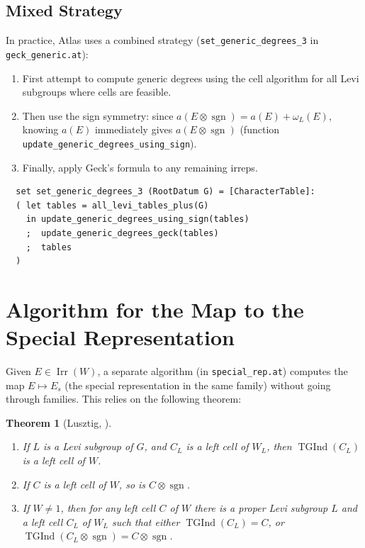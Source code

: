 \documentclass[12pt]{amsart}
\newtheorem{theorem}{Theorem}[section]
\newcommand{\sgn}{\operatorname{sgn}}
\newcommand{\Irr}{\operatorname{Irr}}
\newcommand{\TInd}{\operatorname{TGInd}}
\begin{document}
\subsection{Mixed Strategy}

In practice, Atlas uses a combined strategy (\texttt{set\_generic\_degrees\_3}
in \texttt{geck\_generic.at}):
\begin{enumerate}
  \item First attempt to compute generic degrees using the cell algorithm for
        all Levi subgroups where cells are feasible.
  \item Then use the sign symmetry: since $a(E \otimes \sgn) = a(E) +
        \omega_L(E)$, knowing $a(E)$ immediately gives $a(E \otimes \sgn)$
        (function \texttt{update\_generic\_degrees\_using\_sign}).
  \item Finally, apply Geck's formula to any remaining irreps.
\end{enumerate}
\begin{verbatim}
  set set_generic_degrees_3 (RootDatum G) = [CharacterTable]:
  ( let tables = all_levi_tables_plus(G)
    in update_generic_degrees_using_sign(tables)
    ;  update_generic_degrees_geck(tables)
    ;  tables
  )
\end{verbatim}

\section{Algorithm for the Map to the Special Representation}

Given $E \in \Irr(W)$, a separate algorithm (in \texttt{special\_rep.at})
computes the map $E \mapsto E_s$ (the special representation in the same
family) without going through families.  This relies on the following theorem:

\begin{theorem}[Lusztig, {\cite{Lusztig:orange}}]
  \label{thm:to_special}
  \begin{enumerate}
    \item[\textup{(a)}] If $L$ is a Levi subgroup of $G$, and $C_L$ is a
          left cell of $W_L$, then $\TInd(C_L)$ is a left cell of $W$.
    \item[\textup{(b)}] If $C$ is a left cell of $W$, so is $C \otimes \sgn$.
    \item[\textup{(c)}] If $W \neq 1$, then for any left cell $C$ of $W$ there
          is a proper Levi subgroup $L$ and a left cell $C_L$ of $W_L$ such that
          either $\TInd(C_L) = C$, or $\TInd(C_L \otimes \sgn) = C \otimes \sgn$.
  \end{enumerate}
\end{theorem}
\end{document}
